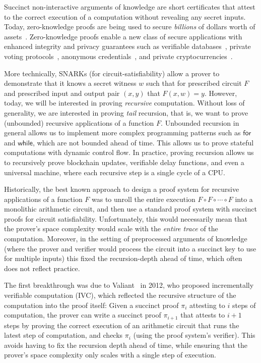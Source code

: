 Succinct non-interactive arguments of knowledge are short certificates that attest to the correct execution of a computation without revealing any secret inputs. 
%
Today, 
zero-knowledge proofs are being used 
to secure \emph{billions} of dollars worth of assets~\cite{zerocash, stark}.
%
Zero-knowledge proofs 
enable a new class of secure applications 
with enhanced integrity and privacy guarantees
such as verifiable databases~\cite{zkvsql, vsql, accountablestorage, integridb},
private voting protocols~\cite{privatevoting},
anonymous credentials~\cite{cinderella, dacreds},
and
private cryptocurrencies~\cite{zerocash, pinocchiocoin, stark}.

More technically, 
SNARKs 
(for circuit-satisfiability)
allow a prover to demonstrate that it knows a secret witness $w$
such that for prescribed circuit $F$ and prescribed input and output pair $(x, y)$ that $F(x, w) = y$.
%
However, today, we will be interested in
proving \emph{recursive} computation. 
Without loss of generality, we are interested in proving \emph{tail}
recursion,
that is, we want to prove
(unbounded) recursive applications 
of a function $F$.
Unbounded recursion
in general allows us to implement more complex programming patterns such as 
$\mathsf{for}$ and $\mathsf{while}$, 
which are not bounded ahead of time.
This allows us to prove stateful computations with dynamic control flow.
In practice, 
proving recursion allows us to recursively prove blockchain updates, verifiable delay functions, and even a universal machine,
where each recursive step is a single cycle of a CPU.


Historically, 
the best known approach to design a proof system for recursive applications of a function $F$ 
was to unroll the entire execution $F \circ F \circ \cdots \circ F$ into a monolithic arithmetic circuit,
and then use a standard proof system with succinct proofs for circuit satisfiability.
%
Unfortunately,
this would necessarily mean that the prover's space complexity would scale with the \emph{entire trace} of the computation.
%
Moreover, 
in the setting of preprocessed arguments of knowledge
(where the prover and verifier would process the circuit into a succinct key to use for multiple inputs)
this fixed the recursion-depth ahead of time,
which often does not reflect practice.

The first breakthrough was due to Valiant~\cite{valiant} in 2012, 
who proposed incrementally verifiable computation (IVC),
which reflected the recursive structure of the computation
into the proof itself:
%
Given a succinct proof $\pi_{i}$ attesting to $i$ steps of computation,
the prover can write a succinct proof $\pi_{i + 1}$ that attests to $i + 1$ steps
by proving the correct execution of an arithmetic circuit 
that runs the latest step of computation,
and checks $\pi_i$ 
(using the proof system's verifier).
This avoids having to fix the recursion depth ahead of time,
while ensuring that the prover's space complexity only scales with a single step of execution.

